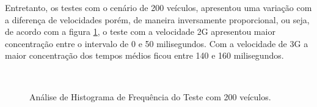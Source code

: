 \documentclass[
	12pt,				%
	oneside,			%
	a4paper,			%
	english,			%
	brazil				%
	]{abntex2ppgsi}
\begin{document}
Entretanto, os testes com o cenário de 200 veículos, apresentou uma variação com a diferença de velocidades porém, de maneira inversamente proporcional, ou seja, de acordo com a figura \ref{fig:imgHistFreq200}, o teste com a velocidade 2G apresentou maior concentração entre o intervalo de 0 e 50 milisegundos. Com a velocidade de 3G a maior concentração dos tempos médios ficou entre 140 e 160 milisegundos.
 
\begin{figure}[ht]
	\caption{Análise de Histograma de Frequência do Teste  com 200 veículos.}
	\centering
	\label{fig:imgHistFreq200}
	\\
\end{figure}
\end{document}
